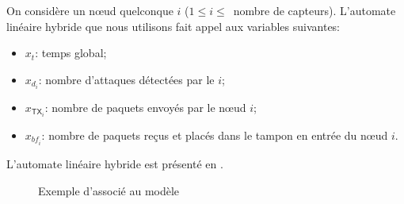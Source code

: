 On considère un nœud quelconque $i$ ($1\leq i\leq$~nombre de capteurs).
L'automate linéaire hybride que nous utilisons fait appel aux variables suivantes:
\begin{itemize}
    \item $x_t$: temps global;
    \item $x_{d_i}$: nombre d'attaques détectées par le \cn $i$;
    \item $x_{\mathsf{TX}_i}$: nombre de paquets envoyés par le nœud $i$;
    \item $x_{\mathit{bf}_i}$: nombre de paquets reçus et placés dans le tampon en entrée du nœud $i$.
\end{itemize}
L'automate linéaire hybride est présenté en .
\begin{figure}[!b]
    \caption{Exemple d'\alh associé au modèle \rpsge}\label{sa:fig:lha}
\end{figure}
